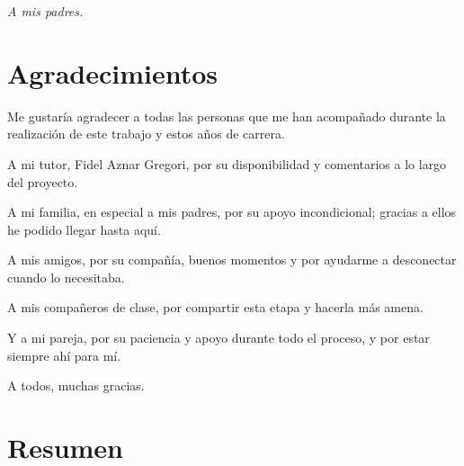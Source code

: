 
\thispagestyle{empty}
\vspace*{\fill}
\begin{flushright}
  \textit{A mis padres.}
\end{flushright}
\vspace*{\fill}
\cleardoublepage

\chapter*{Agradecimientos}


\noindent Me gustaría agradecer a todas las personas que me han acompañado durante la realización de este trabajo y estos años de carrera.

A mi tutor, Fidel Aznar Gregori, por su disponibilidad y comentarios a lo largo del proyecto.

A mi familia, en especial a mis padres, por su apoyo incondicional; gracias a ellos he podido llegar hasta aquí.

A mis amigos, por su compañía, buenos momentos y por ayudarme a desconectar cuando lo necesitaba.

A mis compañeros de clase, por compartir esta etapa y hacerla más amena.

Y a mi pareja, por su paciencia y apoyo durante todo el proceso, y por estar siempre ahí para mí.

A todos, muchas gracias.


\cleardoublepage

\chapter*{Resumen}

